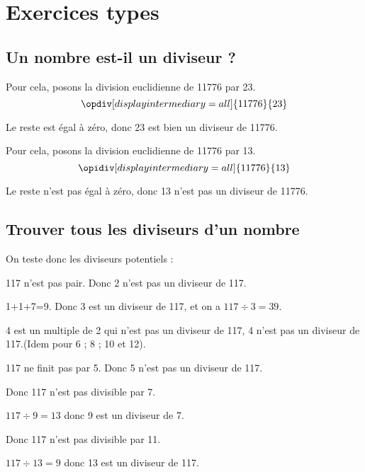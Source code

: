 
\section{Exercices types}
	\subsection{Un nombre est-il un diviseur ?}

\begin{minipage}[t]{0.45\textwidth}

	Pour cela, posons la division euclidienne de 11776 par 23.
	$$\opdiv[displayintermediary=all]{11776}{23}$$	

	Le reste est égal à zéro, donc 23 est bien un diviseur de 11776.


\end{minipage}
\hfil
\vrule
\hfil
\begin{minipage}[t]{0.45\textwidth}

	Pour cela, posons la division euclidienne de 11776 par 13.
	$$\opidiv[displayintermediary=all]{11776}{13}$$

	Le reste n'est pas égal à zéro, donc 13 n'est pas un diviseur de 11776.

\end{minipage}

\subsection{Trouver tous les diviseurs d'un nombre}


On teste donc les diviseurs potentiels : 
\begin{multicols}{4}
	117 n'est pas pair. Donc 2 n'est pas un diviseur de 117.
	\columnbreak

	1+1+7=9. Donc 3 est un diviseur de 117, et on a $117\div3=39$.
	\columnbreak

	4 est un multiple de 2 qui n'est pas un diviseur de 117, 4 n'est pas un diviseur de 117.(Idem pour 6 ; 8 ; 10 et 12).
	\columnbreak

	117 ne finit pas par 5. Donc 5 n'est pas un diviseur de 117.	
\end{multicols}
\begin{multicols}{4}
	 Donc 117 n'est pas divisible par 7.
	\columnbreak

	$117\div9=13$ donc 9 est un diviseur de 7.
	\columnbreak

	 Donc 117 n'est pas divisible par 11.
	\columnbreak

	$117\div13=9$ donc 13 est un diviseur de 117.
\end{multicols}

